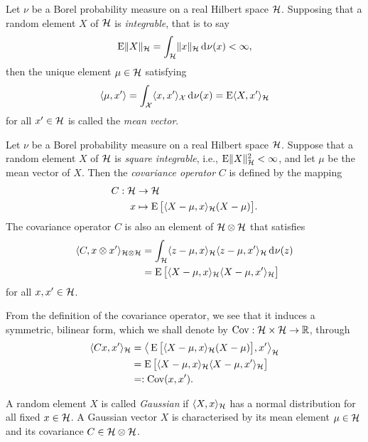 \begin{definition}
  Let $\nu$ be a Borel probability measure on a real Hilbert space ${\mathcal H}$.
  Supposing that a random element $X$ of ${\mathcal H}$ is \emph{integrable}, that is to say
  \[
    \operatorname{E} \lVert X\rVert_{\mathcal H} = \int_{\mathcal H} \lVert x\rVert_{\mathcal H} \operatorname{d}\hspace{0.5pt}\!\nu(x) < \infty,
  \]
  then the unique element $\mu\in{\mathcal H}$ satisfying 
  \[
    \langle\mu,x'\rangle = \int_{\mathcal X} \langle x,x'\rangle_{\mathcal X} \operatorname{d}\hspace{0.5pt}\!\nu(x) = \operatorname{E}\langle X,x'\rangle_{\mathcal H}
  \]
  for all $x' \in {\mathcal H}$ is called the \emph{mean vector}. 
\end{definition}

\begin{definition}
  Let $\nu$ be a Borel probability measure on a real Hilbert space ${\mathcal H}$.
  Suppose that a random element $X$ of ${\mathcal H}$ is \emph{square integrable}, i.e., $\operatorname{E} \lVert X\rVert_{\mathcal H}^2 < \infty$, and let $\mu$ be the mean vector of $X$.
  Then the \emph{covariance operator} $C$ is defined by the mapping
  \begin{align*}
    C:{\mathcal H} &\to {\mathcal H} \\
    x &\mapsto \operatorname{E}\big[\langle X - \mu, x\rangle_{{\mathcal H}}(X - \mu) \big].
  \end{align*}
  The covariance operator $C$ is also an element of ${\mathcal H}\otimes{\mathcal H}$ that satisfies
  \begin{align*}
    \langle C,x\otimes x'\rangle_{{\mathcal H}\otimes{\mathcal H}} 
    &= \int_{\mathcal H} \langle z-\mu, x\rangle_{\mathcal H}\langle z-\mu,x'\rangle_{\mathcal H} \operatorname{d}\hspace{0.5pt}\!\nu(z) \\
    &= \operatorname{E}\big[\langle X-\mu,x\rangle_{\mathcal H} \langle X-\mu,x'\rangle_{\mathcal H}\big]
  \end{align*}
  for all $x,x'\in{\mathcal H}$.
\end{definition}

From the definition of the covariance operator, we see that it induces a symmetric, bilinear form, which we shall denote by $\operatorname{Cov}:{\mathcal H}\times{\mathcal H}\to\mathbb{R}$, through
\begin{align*}
  \langle Cx,x'\rangle_{\mathcal H} 
  &= \big\langle\operatorname{E}\big[\langle X - \mu, x\rangle_{{\mathcal H}}(X - \mu) \big], x' \big\rangle_{\mathcal H} \\
  &= \operatorname{E}\big[\langle X-\mu,x\rangle_{\mathcal H} \langle X-\mu,x'\rangle_{\mathcal H}\big] \\
  &=: \operatorname{Cov}(x,x').
\end{align*}

\begin{definition}
  A random element $X$ is called \emph{Gaussian} if $\langle X,x\rangle_{\mathcal H}$ has a normal distribution for all fixed $x\in{\mathcal H}$.
  A Gaussian vector $X$ is characterised by its mean element $\mu\in{\mathcal H}$ and its covariance $C\in{\mathcal H}\otimes{\mathcal H}$.
\end{definition}

